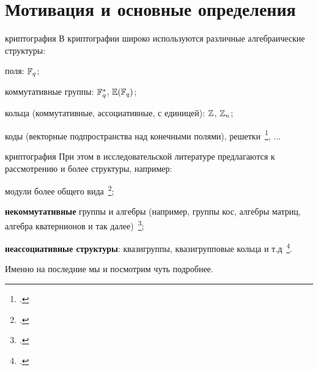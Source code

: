 
\section{Мотивация и основные определения}

\begin{frame}{  криптография}
    В криптографии широко используются различные алгебраические структуры:
    \begin{coloritemize}
        \item поля: $\mathbb{F}_q$;
        \item коммутативные группы: $\mathbb{F}_q^*$, $\mathbb{E}(\mathbb{F}_q)$;
        \item кольца (коммутативные, ассоциативные, с единицей): $\mathbb{Z}$, $\mathbb{Z}_n$;
        \item коды (векторные подпространства над конечными полями), решетки~\footcite{pqcrypto}, ...
    \end{coloritemize}
\end{frame}


\begin{frame}{  криптография}
    При этом в исследовательской литературе предлагаются к рассмотрению и более   структуры, например:
    \begin{coloritemize}
        \item модули более общего вида~\footcite{nechaev95};
        \item \textbf{некоммутативные} группы и алгебры (например, группы кос, алгебры матриц, алгебра кватернионов и так далее)~\footcite{myasnikov2011non, romankov, moldovyan};
        \item \textbf{неассоциативные структуры}: квазигруппы, квазигрупповые кольца и т.д~\footcite{glukhov, artamonov18, markov2020nonassociative}.
    \end{coloritemize}
    Именно на последние мы и посмотрим чуть подробнее.
\end{frame}


